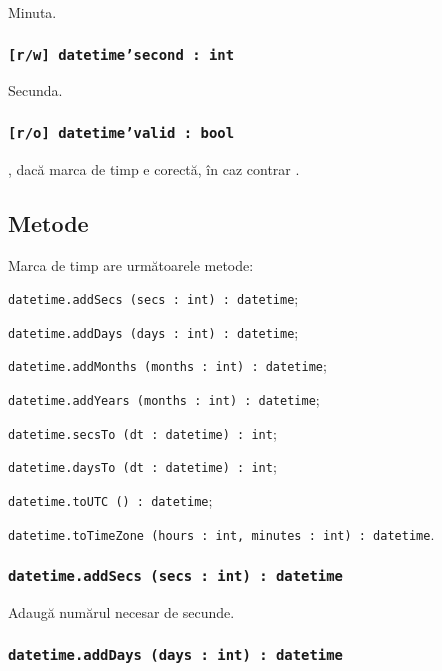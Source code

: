 Minuta.

\subsubsection{\texttt{[r/w] datetime'second : int}}

Secunda.

\subsubsection{\texttt{[r/o] datetime'valid : bool}}

\true, dacă marca de timp e corectă, în caz contrar \false.

\subsection{Metode}

Marca de timp are următoarele metode:
\begin{icItems}
	\item \texttt{datetime.addSecs (secs : int) : datetime};
	\item \texttt{datetime.addDays (days : int) : datetime};
	\item \texttt{datetime.addMonths (months : int) : datetime};
	\item \texttt{datetime.addYears (months : int) : datetime};
	\item \texttt{datetime.secsTo (dt : datetime) : int};
	\item \texttt{datetime.daysTo (dt : datetime) : int};
	\item \texttt{datetime.toUTC () : datetime};
	\item \texttt{datetime.toTimeZone (hours : int, minutes : int) : datetime}.
\end{icItems}

\subsubsection{\texttt{datetime.addSecs (secs : int) : datetime}}

Adaugă numărul necesar de secunde.

\subsubsection{\texttt{datetime.addDays (days : int) : datetime}}

